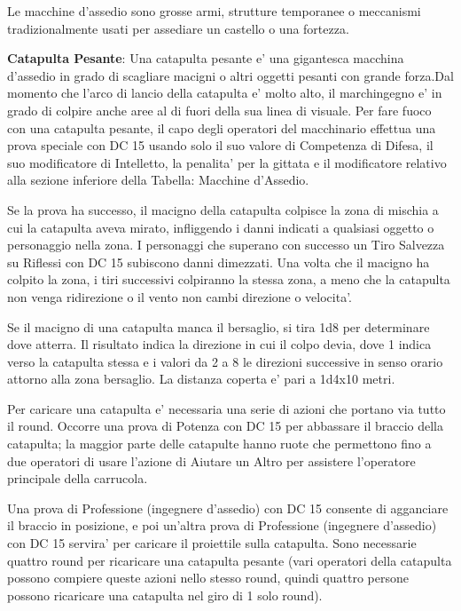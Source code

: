 \documentclass[a4paper,11pt,twoside,openany]{dndbook}
\begin{document}
Le macchine d'assedio sono grosse armi, strutture temporanee o meccanismi tradizionalmente usati per assediare un castello o una fortezza.

\textbf{Catapulta Pesante}: Una catapulta pesante e' una gigantesca macchina d'assedio in grado di scagliare macigni o altri oggetti pesanti con grande forza.Dal momento che l'arco di lancio della catapulta e' molto alto, il marchingegno e' in grado di colpire anche aree al di fuori della sua linea di visuale. Per fare fuoco con una catapulta pesante, il capo degli operatori del macchinario effettua una prova speciale con DC 15 usando solo il suo valore di Competenza di Difesa, il suo modificatore di Intelletto, la penalita' per la gittata e il modificatore relativo alla sezione inferiore della Tabella: Macchine d'Assedio. 

Se la prova ha successo, il macigno della catapulta colpisce la zona di mischia a cui la catapulta aveva mirato, infliggendo i danni indicati a qualsiasi oggetto o personaggio nella zona. I personaggi che superano con successo un Tiro Salvezza su Riflessi con DC 15 subiscono danni dimezzati. Una volta che il macigno ha colpito la zona, i tiri successivi colpiranno la stessa zona, a meno che la catapulta non venga ridirezione o il vento non cambi direzione o velocita'.

Se il macigno di una catapulta manca il bersaglio, si tira 1d8 per determinare dove atterra. Il risultato indica la direzione in cui il colpo devia, dove 1 indica verso la catapulta stessa e i valori da 2 a 8 le direzioni successive in senso orario attorno alla zona bersaglio. La distanza coperta e' pari a 1d4x10 metri.

Per caricare una catapulta e' necessaria una serie di azioni che portano via tutto il round. Occorre una prova di Potenza con DC 15 per abbassare il braccio della catapulta; la maggior parte delle catapulte hanno ruote che permettono fino a due operatori di usare l'azione di Aiutare un Altro per assistere l'operatore principale della carrucola.

Una prova di Professione (ingegnere d'assedio) con DC 15 consente di agganciare il braccio in posizione, e poi un'altra prova di Professione (ingegnere d'assedio) con DC 15 servira' per caricare il proiettile sulla catapulta. Sono necessarie quattro round per ricaricare una catapulta pesante (vari operatori della catapulta possono compiere queste azioni nello stesso round, quindi quattro persone possono ricaricare una catapulta nel giro di 1 solo round).
\end{document}
